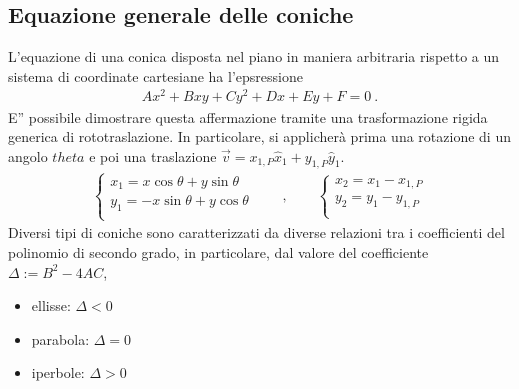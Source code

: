 \documentclass[letterpaper,10pt,italian]{jupyterBook}
\begin{document}
\subsection{Equazione generale delle coniche}
\label{\detokenize{ch/analytic_geometry/analytic_geometry_2d/conics-general:equazione-generale-delle-coniche}}\label{\detokenize{ch/analytic_geometry/analytic_geometry_2d/conics-general:geometry-analytic-2d-conics-general}}\label{\detokenize{ch/analytic_geometry/analytic_geometry_2d/conics-general::doc}}
\sphinxAtStartPar
L’equazione di una conica disposta nel piano in maniera arbitraria rispetto a un sistema di coordinate cartesiane ha l’epsressione
\begin{equation*}
\begin{split}A x^2 + B x y + C y^2 + D x + E y + F = 0 \ .\end{split}
\end{equation*}
\sphinxAtStartPar
E” possibile dimostrare questa affermazione tramite una trasformazione rigida generica di roto\sphinxhyphen{}traslazione. In particolare, si applicherà prima una rotazione di un angolo \(theta\) e poi una traslazione \(\vec{v} = x_{1,P} \hat{x}_1 + y_{1,P} \hat{y}_1\).
\begin{equation*}
\begin{split}
\begin{cases}
x_1 =   x \cos \theta + y \sin \theta \\
y_1 = - x \sin \theta + y \cos \theta \\
\end{cases}
\qquad , \qquad
\begin{cases}
x_2 = x_1 - x_{1,P}  \\
y_2 = y_1 - y_{1,P}  \\
\end{cases}
\end{split}
\end{equation*}
\sphinxAtStartPar
Diversi tipi di coniche sono caratterizzati da diverse relazioni tra i coefficienti del polinomio di secondo grado, in particolare, dal valore del coefficiente \(\Delta := B^2 - 4 A C\),
\begin{itemize}
\item {} 
\sphinxAtStartPar
ellisse:  \(\Delta < 0\)

\item {} 
\sphinxAtStartPar
parabola: \(\Delta = 0\)

\item {} 
\sphinxAtStartPar
iperbole: \(\Delta > 0\)

\end{itemize}
\end{document}
